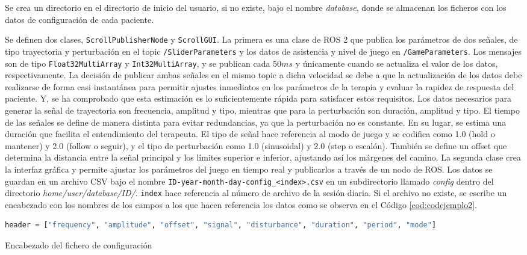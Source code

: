 Se crea un directorio en el directorio de inicio del usuario, si no existe, bajo el nombre \textit{database}, donde se almacenan los ficheros con los datos de configuración de cada paciente.

Se definen dos clases, \verb|ScrollPublisherNode| y \verb|ScrollGUI|.
La primera es una clase de ROS 2 que publica los parámetros de dos señales, de tipo trayectoria y perturbación en el topic \verb|/SliderParameters| y los datos de asistencia y nivel de juego en \verb|/GameParameters|.
Los mensajes son de tipo \verb|Float32MultiArray| y \verb|Int32MultiArray|, y se publican cada $50 ms$ y únicamente cuando se actualiza el valor de los datos, respectivamente.
La decisión de publicar ambas señales en el mismo topic a dicha velocidad se debe a que la actualización de los datos debe realizarse de forma casi instantánea para permitir ajustes inmediatos en los parámetros de la terapia y evaluar la rapidez de respuesta del paciente.
Y, se ha comprobado que esta estimación es lo suficientemente rápida para satisfacer estos requisitos.
Los datos necesarios para generar la señal de trayectoria son frecuencia, amplitud y tipo, mientras que para la perturbación son duración, amplitud y tipo.
El tiempo de las señales se define de manera distinta para evitar redundancias, ya que la perturbación no es constante.
En su lugar, se estima una duración que facilita el entendimiento del terapeuta.
El tipo de señal hace referencia al modo de juego y se codifica como 1.0 (hold o mantener) y 2.0 (follow o seguir), y el tipo de perturbación como 1.0 (sinusoidal) y 2.0 (step o escalón).
También se define un offset que determina la distancia entre la señal principal y los límites superior e inferior, ajustando así los márgenes del camino.
La segunda clase crea la interfaz gráfica y permite ajustar los parámetros del juego en tiempo real y publicarlos a través de un nodo de ROS.
Los datos se guardan en un archivo CSV bajo el nombre \verb|ID-year-month-day-config_<index>.csv| en un subdirectorio llamado \textit{config} dentro del directorio \textit{home/user/database/ID/}.
\verb|index| hace referencia al número de archivo de la sesión diaria.
Si el archivo no existe, se escribe un encabezado con los nombres de los campos a los que hacen referencia los datos como se observa en el Código \ref{cod:codejemplo2}.

\begin{code}[h]
\begin{lstlisting}[language=Python]
header = ["frequency", "amplitude", "offset", "signal", "disturbance", "duration", "period", "mode"]
\end{lstlisting}
\caption[Encabezado del fichero de configuración]{Encabezado del fichero de configuración}
\label{cod:codejemplo2}
\end{code}

